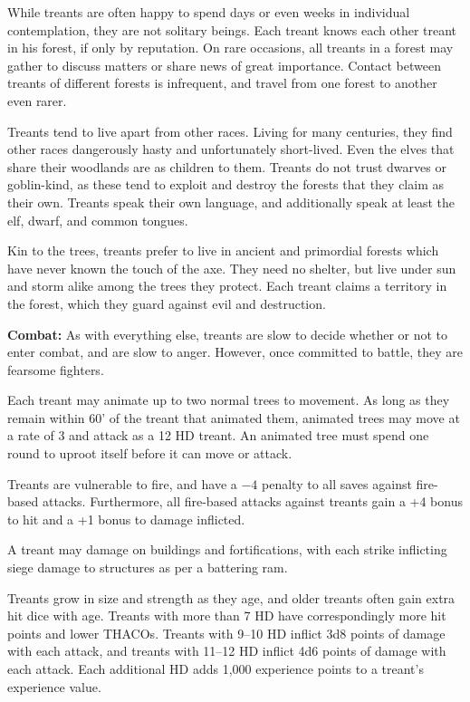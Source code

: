 \begin{multicols}{2}
While treants are often happy to spend days or even weeks in individual contemplation, they are not solitary beings. Each treant knows each other treant in his forest, if only by reputation. On rare occasions, all treants in a forest may gather to discuss matters or share news of great importance. Contact between treants of different forests is infrequent, and travel from one forest to another even rarer.

Treants tend to live apart from other races. Living for many centuries, they find other races dangerously hasty and unfortunately short-lived. Even the elves that share their woodlands are as children to them. Treants do not trust dwarves or goblin-kind, as these tend to exploit and destroy the forests that they claim as their own. Treants speak their own language, and additionally speak at least the elf, dwarf, and common tongues.

Kin to the trees, treants prefer to live in ancient and primordial forests which have never known the touch of the axe. They need no shelter, but live under sun and storm alike among the trees they protect. Each treant claims a territory in the forest, which they guard against evil and destruction.

\textbf{Combat:} As with everything else, treants are slow to decide whether or not to enter combat, and are slow to anger. However, once committed to battle, they are fearsome fighters.

Each treant may animate up to two normal trees to movement. As long as they remain within 60' of the treant that animated them, animated trees may move at a rate of 3 and attack as a 12 HD treant. An animated tree must spend one round to uproot itself before it can move or attack.

Treants are vulnerable to fire, and have a $-4$ penalty to all saves against fire-based attacks. Furthermore, all fire-based attacks against treants gain a +4 bonus to hit and a +1 bonus to damage inflicted.

A treant may damage on buildings and fortifications, with each strike inflicting siege damage to structures as per a battering ram.

Treants grow in size and strength as they age, and older treants often gain extra hit dice with age. Treants with more than 7 HD have correspondingly more hit points and lower THACOs. Treants with 9--10 HD inflict 3d8 points of damage with each attack, and treants with 11--12 HD inflict 4d6 points of damage with each attack. Each additional HD adds 1,000 experience points to a treant's experience value.


\end{multicols}
